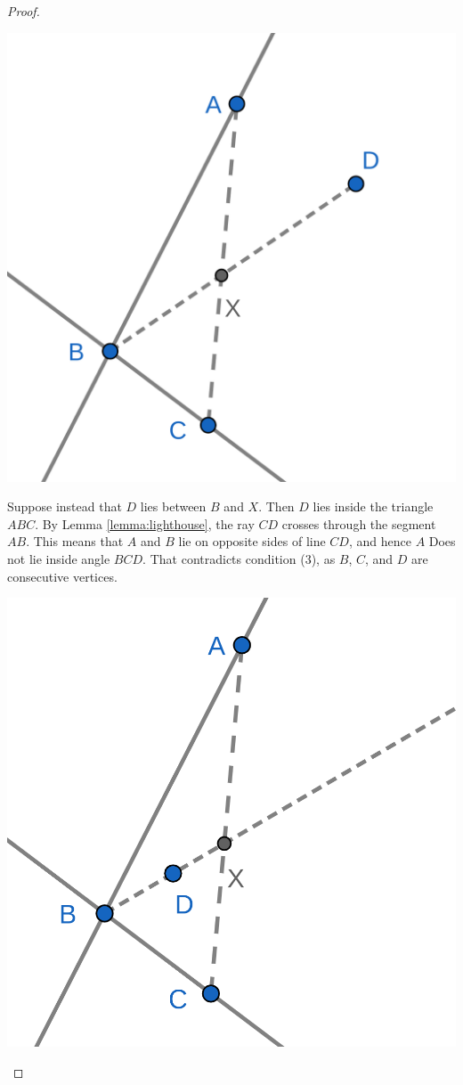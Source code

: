 \documentclass{tufte-handout}
\theoremstyle{definition}
\begin{document}
\begin{proof}
\begin{description}
\begin{marginfigure}
  \includegraphics{images/convex_4.png}
\end{marginfigure}

Suppose instead that $D$ lies between $B$ and $X$. Then $D$ lies inside the triangle $ABC$. By Lemma \ref{lemma:lighthouse}, the ray $CD$ crosses through the segment $AB$. This means that $A$ and $B$ lie on opposite sides of line $CD$, and hence $A$ Does not lie inside angle $BCD$. That contradicts condition (3), as $B$, $C$, and $D$ are consecutive vertices.


\begin{marginfigure}
  \includegraphics{images/convex_5.png}
\end{marginfigure}



\end{description}
\end{proof}
\end{document}
